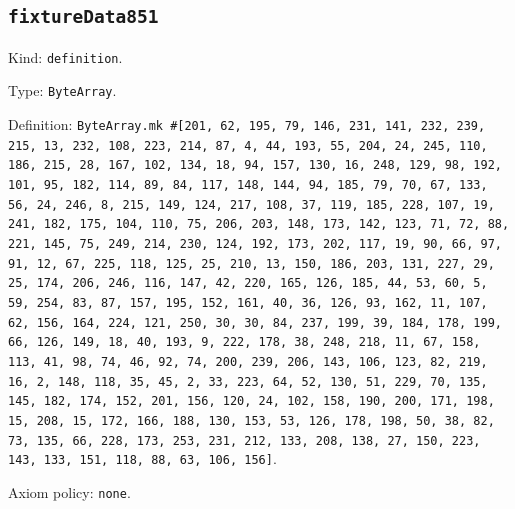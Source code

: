 \documentclass[11pt]{article}
\begin{document}
\subsection*{\texttt{fixtureData851}}
\noindent Kind: \texttt{definition}.\par
\noindent Type: \texttt{ByteArray}.\par
\noindent Definition: \texttt{ByteArray.mk \#[201, 62, 195, 79, 146, 231, 141, 232, 239, 215, 13, 232, 108, 223, 214, 87, 4, 44, 193, 55, 204, 24, 245, 110, 186, 215, 28, 167, 102, 134, 18, 94, 157, 130, 16, 248, 129, 98, 192, 101, 95, 182, 114, 89, 84, 117, 148, 144, 94, 185, 79, 70, 67, 133, 56, 24, 246, 8, 215, 149, 124, 217, 108, 37, 119, 185, 228, 107, 19, 241, 182, 175, 104, 110, 75, 206, 203, 148, 173, 142, 123, 71, 72, 88, 221, 145, 75, 249, 214, 230, 124, 192, 173, 202, 117, 19, 90, 66, 97, 91, 12, 67, 225, 118, 125, 25, 210, 13, 150, 186, 203, 131, 227, 29, 25, 174, 206, 246, 116, 147, 42, 220, 165, 126, 185, 44, 53, 60, 5, 59, 254, 83, 87, 157, 195, 152, 161, 40, 36, 126, 93, 162, 11, 107, 62, 156, 164, 224, 121, 250, 30, 30, 84, 237, 199, 39, 184, 178, 199, 66, 126, 149, 18, 40, 193, 9, 222, 178, 38, 248, 218, 11, 67, 158, 113, 41, 98, 74, 46, 92, 74, 200, 239, 206, 143, 106, 123, 82, 219, 16, 2, 148, 118, 35, 45, 2, 33, 223, 64, 52, 130, 51, 229, 70, 135, 145, 182, 174, 152, 201, 156, 120, 24, 102, 158, 190, 200, 171, 198, 15, 208, 15, 172, 166, 188, 130, 153, 53, 126, 178, 198, 50, 38, 82, 73, 135, 66, 228, 173, 253, 231, 212, 133, 208, 138, 27, 150, 223, 143, 133, 151, 118, 88, 63, 106, 156]}.\par
\noindent Axiom policy: \texttt{none}.\par
\end{document}
